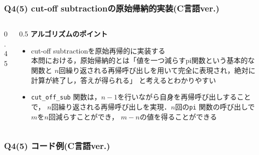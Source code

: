 \begin{frame}[fragile]
\frametitle{Q4(5) cut-off subtractionの原始帰納的実装(C言語ver.)}
    \begin{columns}[c]
        
        \begin{column}{0.45\textwidth}
            
        \end{column}
        
        \begin{column}{0.5\textwidth}
            \small
            \textbf{アルゴリズムのポイント}
            \begin{itemize}
                \item cut-off subtractionを原始再帰的に実装する \\ 
                本問における，原始帰納的とは「値を一つ減らすpi関数という基本的な関数と
                $n$回繰り返される再帰呼び出しを用いて完全に表現され，絶対に計算が終了し，答えが得られる」
                と考えるとわかりやすい
                \item \texttt{cut\_off\_sub} 関数は，$n-1$を行いながら自身を再帰呼び出しすることで，
                $n$回繰り返される再帰呼び出しを実現．$n$回の\texttt{pi} 関数の呼び出しで$m$を$n$回減らすことができ，
                $m-n$の値を得ることができる
            \end{itemize}
        \end{column}
    \end{columns}
\end{frame}

\begin{frame}[fragile]
\frametitle{Q4(5) コード例(C言語ver.)}
    
\end{frame}

